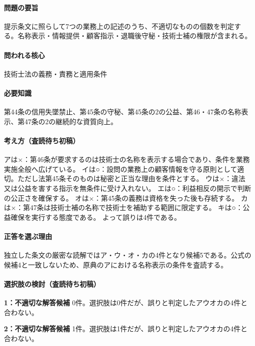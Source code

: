 \paragraph{問題の要旨} 提示条文に照らして7つの業務上の記述のうち、不適切なものの個数を判定する。名称表示・情報提供・顧客指示・退職後守秘・技術士補の権限が含まれる。

\paragraph{問われる核心} 技術士法の義務・責務と適用条件

\paragraph{必要知識} 第44条の信用失墜禁止、第45条の守秘、第45条の2の公益、第46・47条の名称表示、第47条の2の継続的な資質向上。

\paragraph{考え方（査読待ち初稿）} アは×：第46条が要求するのは技術士の名称を表示する場合であり、条件を業務実施全般へ広げている。 イは○：設問の業務上の顧客情報を守る原則として適切。ただし法第45条そのものは秘密と正当な理由を条件とする。 ウは×：違法又は公益を害する指示を無条件に受け入れない。 エは○：利益相反の開示で判断の公正さを確保する。 オは×：第45条の義務は資格を失った後も存続する。 カは×：第47条は技術士補の名称で技術士を補助する範囲に限定する。 キは○：公益確保を実行する態度である。 よって誤りは4件である。

\paragraph{正答を選ぶ理由} 独立した条文の厳密な読解ではア・ウ・オ・カの4件となり候補5である。公式の候補4と一致しないため、原典のアにおける名称表示の条件を査読する。

\paragraph{選択肢の検討（査読待ち初稿）}

\noindent\textbf{1：不適切な解答候補} 0件。選択肢は0件だが、誤りと判定したアウオカの4件と合わない。\par

\noindent\textbf{2：不適切な解答候補} 1件。選択肢は1件だが、誤りと判定したアウオカの4件と合わない。\par

